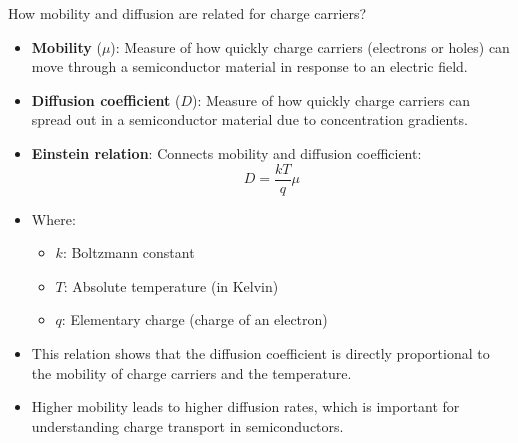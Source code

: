 \begin{frame}{How mobility and diffusion are related for charge carriers?}
    \begin{itemize}
        \item \textbf{Mobility} ($\mu$): Measure of how quickly charge carriers (electrons or holes) can move through a semiconductor material in response to an electric field.
        \item \textbf{Diffusion coefficient} ($D$): Measure of how quickly charge carriers can spread out in a semiconductor material due to concentration gradients.
        \item \textbf{Einstein relation}: Connects mobility and diffusion coefficient:
        \begin{equation}
        D = \frac{kT}{q} \mu    
        \end{equation}
        \item Where:
        \begin{itemize}
            \item $k$: Boltzmann constant
            \item $T$: Absolute temperature (in Kelvin)
            \item $q$: Elementary charge (charge of an electron)
        \end{itemize}
        \item This relation shows that the diffusion coefficient is directly proportional to the mobility of charge carriers and the temperature.
        \item Higher mobility leads to higher diffusion rates, which is important for understanding charge transport in semiconductors.
    \end{itemize}
    \end{frame}

